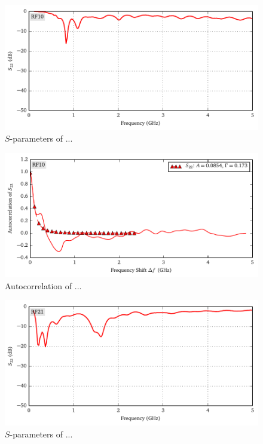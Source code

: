 \begin{figure}
 \centering
 \includegraphics{figs/active/RF10-sParameters.pdf}
 \caption{$S$-parameters of ...}
\end{figure}

\begin{figure}
 \centering
 \includegraphics{figs/active/RF10-autoCorrelation.pdf}
 \caption{Autocorrelation of ...}
\end{figure}

\begin{figure}
 \centering
 \includegraphics{figs/active/RF21-sParameters.pdf}
 \caption{$S$-parameters of ...}
\end{figure}

